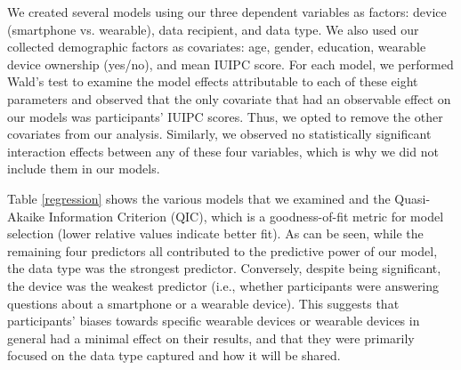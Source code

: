 We created several models using our three dependent variables as factors: device (smartphone vs. wearable), data recipient, and data type. We also used our collected demographic factors as covariates: age, gender, education, wearable device ownership (yes/no), and mean IUIPC score. For each model, we performed Wald's test to examine the model effects attributable to each of these eight parameters and observed that the only covariate that had an observable effect on our models was participants' IUIPC scores. Thus, we opted to remove the other covariates from our analysis. Similarly, we observed no statistically significant interaction effects between any of these four variables, which is why we did not include them in our models.

Table \ref{regression} shows the various models that we examined and the Quasi-Akaike Information Criterion (QIC), which is a goodness-of-fit metric for model selection (lower relative values indicate better fit). As can be seen, while the remaining four predictors all contributed to the predictive power of our model, the data type was the strongest predictor. Conversely, despite being significant, the device was the weakest predictor (i.e., whether participants were answering questions about a smartphone or a wearable device). This suggests that participants' biases towards specific wearable devices or wearable devices in general had a minimal effect on their results, and that they were primarily focused on the data type captured and how it will be shared.


